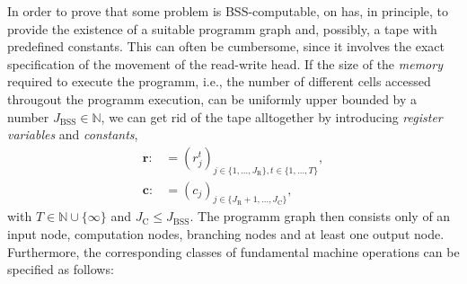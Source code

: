 \documentclass[conference]{IEEEtran}
\def\NN{{\mathbb N}}
\newcommand{\BSS}{\mathrm{BSS}}
\begin{document}
	In order to prove that some problem is BSS-computable, on has, in principle, to provide the existence of a suitable programm graph and, possibly, a tape with predefined constants. 
	This can often be cumbersome, since it involves the exact specification of the movement of the read-write head. If the size of the \emph{memory} required to execute the programm, i.e., 
	the number of different cells accessed througout the programm execution, can be uniformly upper bounded by a number \(J_\BSS \in \NN\), we can get rid of the tape alltogether by 
	introducing \emph{register variables} and \emph{constants},
	\begin{align}	\bm{r} :&= (r_j^t)_{j\in\{1,\ldots,J_{\mathrm{R}}\}, t\in\{1,\ldots,T\}},\\
					\bm{c} :&= (c_j)_{j\in\{J_{\mathrm{R}} + 1,\ldots,J_{\mathrm{C}}\}},
	\end{align}
	with \(T\in\NN\cup\{\infty\}\) and \(J_{\mathrm{C}} \leq J_\BSS\). The programm graph then consists only of an input node, computation nodes, branching nodes and at least one output node.
	Furthermore, the corresponding classes of fundamental machine operations can be specified as follows:
\end{document}
